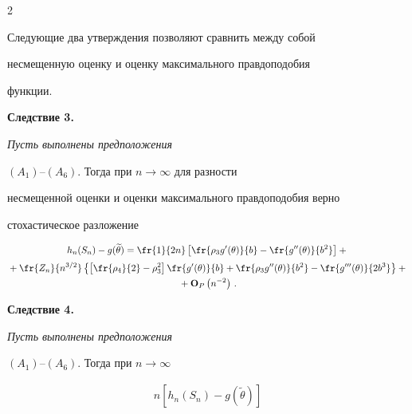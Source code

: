 \begin{multicols}{2}
{   }





  Следующие два утверждения позволяют сравнить между собой


  несмещенную оценку и оценку максимального правдоподобия


  функции.





\medskip





\noindent


{\bf Следствие 3.} {\it Пусть выполнены предположения


    $(A_1)$--$(A_6)$. Тогда при $ n\rightarrow\infty$  для разности


    несмещенной оценки и оценки максимального правдоподобия верно


    стохастическое разложение}


  \begin{multline*}


  h_n(S_n)-g(\widetilde{\theta})=\fr{1}{2n}


      \left[\fr{\rho_3g'(\theta)}{b}-\fr{g''(\theta)}{b^2} \right]+{}


\\[2pt]


{}+\fr{Z_n}{n^{3/2}}\left\{ \left[\fr{\rho_4}{2}-\rho_3^2\right]


      \fr{g'(\theta)}{b}+\fr{\rho_3 g''(\theta)}{b^2}-


      \fr{g'''(\theta)}{2b^3} \right\}+{}\\


      {}+


      {\bf O}_P\left(n^{-2}\right)\,.


\end{multline*}





\medskip





\noindent


{\bf Следствие 4.} {\it Пусть выполнены предположения


    $(A_1)\mbox{--}(A_6)$. Тогда при $ n\rightarrow\infty$ }


   \begin{multline*} 


n\left[h_n(S_n)-g(\widetilde{\theta}) \right]



\end{multline*}
\end{multicols}
